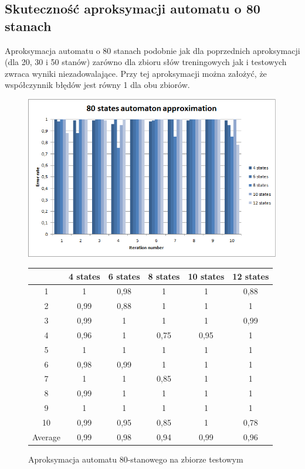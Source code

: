 \documentclass[runningheads,a4paper]{llncs}
\begin{document}
\FloatBarrier
\subsection{Skuteczność aproksymacji automatu o 80 stanach}

Aproksymacja automatu o 80 stanach podobnie jak dla poprzednich aproksymacji (dla 20, 30 i 50 stanów) zarówno dla zbioru słów treningowych jak i testowych zwraca wyniki niezadowalające. Przy tej aproksymacji można założyć, że współczynnik błędów jest równy 1 dla obu zbiorów. \\

\begin{figure}[!htb]
\includegraphics[scale=0.92]{5.png}
\endminipage\hfill
\hspace{2.2cm}
\renewcommand{\arraystretch}{1.3}%
\begin{tabular}{@{}cccccc@{}}
\toprule
        & 4 states & 6 states & 8 states & 10 states & 12 states    \\ \midrule
1       & 1        & 0,98     & 1        & 1         & 0,88 \\
2       & 0,99     & 0,88     & 1        & 1         & 1 \\
3       & 0,99     & 1        & 1        & 1         & 0,99 \\
4       & 0,96     & 1        & 0,75     & 0,95      & 1   \\
5       & 1        & 1        & 1        & 1         & 1   \\
6       & 0,98     & 0,99     & 1        & 1         & 1    \\
7       & 1        & 1        & 0,85     & 1         & 1    \\
8       & 0,99     & 1        & 1        & 1         & 1     \\
9       & 1        & 1        & 1        & 1         & 1 \\
10      & 0,99     & 0,95     & 0,85     & 1         & 0,78  \\ \bottomrule
Average & 0,99     & 0,98     & 0,94    & 0,99     & 0,96  \\ \bottomrule
\end{tabular}
\vspace{4mm}
\endminipage\hfill
\caption{Aproksymacja automatu 80-stanowego na zbiorze testowym}
\end{figure}
\end{document}
